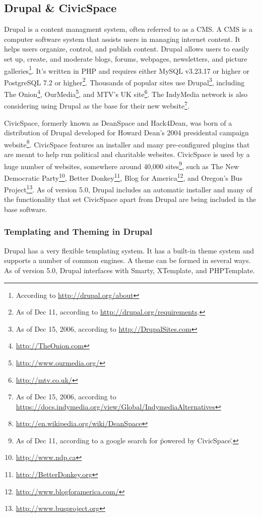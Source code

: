 \documentclass[a4paper,12pt]{report}
\begin{document}
\subsection {Drupal \& CivicSpace}
Drupal is a content managment system, often referred to as a CMS. 
A CMS is a computer software system that assists users in managing internet content.
It helps users organize, control, and publish content.
Drupal allows users to easily set up, create, and moderate blogs, forums, webpages, newsletters, and picture galleries\footnote{According to \url{ http://drupal.org/about}}.
It's written in PHP and requires either MySQL v3.23.17 or higher or PostgreSQL 7.2 or higher\footnote{As of Dec 11, according to \url{ http://drupal.org/requirements}.}.
Thousands of popular sites use Drupal\footnote{As of Dec 15, 2006, according to \url{http://DrupalSites.com}}, including The Onion\footnote{\url{ http://TheOnion.com}}, OurMedia\footnote{\url{http://www.ourmedia.org/}}, and MTV's UK site\footnote{\url{http://mtv.co.uk/} }.
The IndyMedia network is also considering using Drupal as the base for their new website\footnote{As of Dec 15, 2006, according to \url{https://docs.indymedia.org/view/Global/IndymediaAlternatives} }.

CivicSpace, formerly known as DeanSpace and Hack4Dean, was born of a distribution of Drupal developed for Howard Dean's 2004 presidental campaign website\footnote{\url{ http://en.wikipedia.org/wiki/DeanSpace}}.
CivicSpace features an installer and many pre-configured plugins that are meant to help run political and charitable websites.
CivicSpace is used by a huge number of websites, somewhere around 40,000 sites\footnote{As of Dec 11, according to a google search for \"powered by CivicSpace\".}, such as The New Democratic Party\footnote{\url{ http://www.ndp.ca}}, Better Donkey\footnote{\url{http://BetterDonkey.org}}, Blog for America\footnote{\url{ http://www.blogforamerica.com/}}, and Oregon's Bus Project\footnote{\url{http://www.busproject.org}}.
As of version 5.0, Drupal includes an automatic installer and many of the functionality that set CivicSpace apart from Drupal are being included in the base software.


\subsubsection {Templating and Theming in Drupal}
Drupal has a very flexible templating system. 
It has a built-in theme system and supports a number of common engines. 
A theme can be formed in several ways. 
As of version 5.0, Drupal interfaces with Smarty, XTemplate, and PHPTemplate. 
\end{document}

